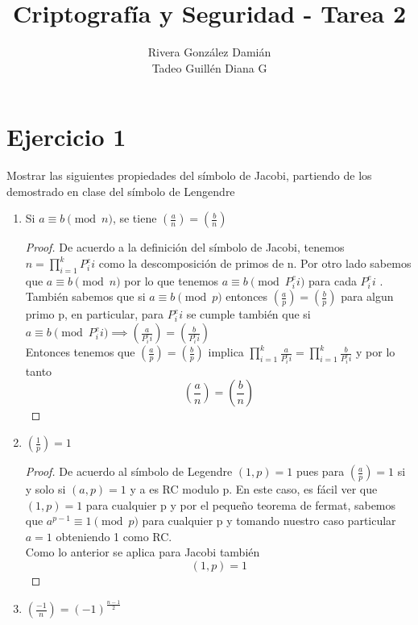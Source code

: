 \documentclass[12pt, letterpaper]{article}
\title{Criptografía y Seguridad - Tarea 2}
\author{Rivera González Damián\\Tadeo Guillén Diana G}
\begin{document}
\maketitle
\section*{Ejercicio 1}
Mostrar las siguientes propiedades del símbolo de Jacobi, partiendo de los demostrado en clase del símbolo de Lengendre
\\
\begin{enumerate}
\item Si $a \equiv b \pmod{n}$, se tiene $ ( \frac{a}{n} ) =  ( \frac{b}{n} )  $
\begin{proof}
De acuerdo a la definición del símbolo de Jacobi, tenemos $n= \prod_{i=1}^k P_i^ei$ como la descomposición de primos de n. Por otro lado sabemos que  $a \equiv b \pmod{n}$ por lo que tenemos  $a \equiv b \pmod{P_i^ei}$ para cada $P_i^ei$ .
\\También sabemos que si $a \equiv b \pmod{p}$ entonces $ ( \frac{a}{p} ) =  ( \frac{b}{p} )  $ para algun primo p, en particular, para $P_i^ei$ se cumple también que si $a \equiv b \pmod{P_i^ei}  \implies  ( \frac{a}{P_i^ei} ) =  ( \frac{b}{P_i^ei} )$
\\
Entonces tenemos que  $ ( \frac{a}{p})=( \frac{b}{p})$ implica $\prod_{i=1}^k \frac{a}{P_i^ei} =\prod_{i=1}^k \frac{b}{P_i^ei}$ y por lo tanto 
\[
\left( \frac{a}{n}\right) = \left( \frac{b}{n}\right)
\]
\end{proof}
\item $(\frac{1}{p})=1$
\begin{proof}
De acuerdo al símbolo de Legendre $(1,p)=1$ pues para $(\frac{a}{p})
= 1$ si y solo si $(a,p)=1$ y a es RC modulo p. En este caso, es fácil ver que $(1,p)=1$ para cualquier p y por el pequeño teorema de fermat, sabemos que $a^{p-1} \equiv 1 \pmod{p}$ para cualquier p y tomando nuestro caso particular $a=1$ obteniendo 1 como RC.
\\
Como lo anterior se aplica para Jacobi también
\[
(1,p)=1
\]
\end{proof}
\item $(\frac{-1}{n})= (-1)^\frac{n-1}{2}$


\end{enumerate}
\end{document}
